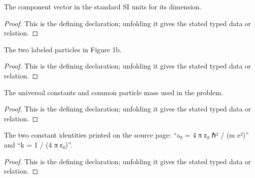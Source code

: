 \begin{definition}[vectorSI]
  \label{decl:physics:IPhO_2026_1_B_2:vectorSI}
  The component vector in the standard SI units for its dimension.
\end{definition}
\begin{proof}
  This is the defining declaration; unfolding it gives the stated typed data or relation.
\end{proof}

\begin{definition}[ParticleLabel]
  \label{decl:physics:IPhO_2026_1_B_2:ParticleLabel}
  The two labeled particles in Figure 1b.
\end{definition}
\begin{proof}
  This is the defining declaration; unfolding it gives the stated typed data or relation.
\end{proof}

\begin{definition}[PhysicalConstants]
  \label{decl:physics:IPhO_2026_1_B_2:PhysicalConstants}
  The universal constants and common particle mass used in the problem.
\end{definition}
\begin{proof}
  This is the defining declaration; unfolding it gives the stated typed data or relation.
\end{proof}

\begin{definition}[ConstantRelations]
  \label{decl:physics:IPhO_2026_1_B_2:ConstantRelations}
  The two constant identities printed on the source page: “a₀ = 4 π ε₀ ℏ² / (m e²)” and “k = 1 / (4 π ε₀)”.
\end{definition}
\begin{proof}
  This is the defining declaration; unfolding it gives the stated typed data or relation.
\end{proof}

